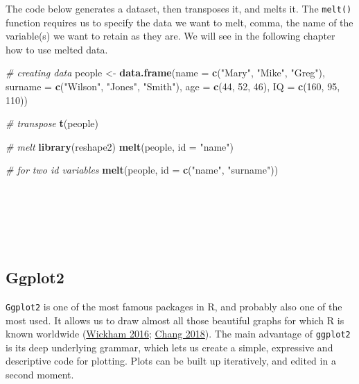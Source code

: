 \documentclass[
]{article}
\newenvironment{Shaded}{\begin{snugshade}}{\end{snugshade}}
\newcommand{\AttributeTok}[1]{\textcolor[rgb]{0.13,0.29,0.53}{#1}}
\newcommand{\CommentTok}[1]{\textcolor[rgb]{0.56,0.35,0.01}{\textit{#1}}}
\newcommand{\DecValTok}[1]{\textcolor[rgb]{0.00,0.00,0.81}{#1}}
\newcommand{\FunctionTok}[1]{\textcolor[rgb]{0.13,0.29,0.53}{\textbf{#1}}}
\newcommand{\NormalTok}[1]{#1}
\newcommand{\OtherTok}[1]{\textcolor[rgb]{0.56,0.35,0.01}{#1}}
\newcommand{\StringTok}[1]{\textcolor[rgb]{0.31,0.60,0.02}{#1}}
\begin{document}
The code below generates a dataset, then transposes it, and melts it.
The \texttt{melt()} function requires us to specify the data we want to melt,
comma, the name of the variable(s) we want to retain as they are. We
will see in the following chapter how to use melted data.

\begin{Shaded}
\begin{Highlighting}[]
\CommentTok{\# creating data}
\NormalTok{people }\OtherTok{\textless{}{-}} \FunctionTok{data.frame}\NormalTok{(}\AttributeTok{name =} \FunctionTok{c}\NormalTok{(}\StringTok{"Mary"}\NormalTok{, }\StringTok{"Mike"}\NormalTok{, }\StringTok{"Greg"}\NormalTok{),}
                     \AttributeTok{surname =} \FunctionTok{c}\NormalTok{(}\StringTok{"Wilson"}\NormalTok{, }\StringTok{"Jones"}\NormalTok{, }\StringTok{"Smith"}\NormalTok{),}
                     \AttributeTok{age =} \FunctionTok{c}\NormalTok{(}\DecValTok{44}\NormalTok{, }\DecValTok{52}\NormalTok{, }\DecValTok{46}\NormalTok{),}
                     \AttributeTok{IQ =} \FunctionTok{c}\NormalTok{(}\DecValTok{160}\NormalTok{, }\DecValTok{95}\NormalTok{, }\DecValTok{110}\NormalTok{))}

\CommentTok{\# transpose}
\FunctionTok{t}\NormalTok{(people)}

\CommentTok{\# melt}
\FunctionTok{library}\NormalTok{(reshape2)}
\FunctionTok{melt}\NormalTok{(people, }\AttributeTok{id =} \StringTok{"name"}\NormalTok{)}

\CommentTok{\# for two id variables}
\FunctionTok{melt}\NormalTok{(people, }\AttributeTok{id =} \FunctionTok{c}\NormalTok{(}\StringTok{"name"}\NormalTok{, }\StringTok{"surname"}\NormalTok{))}
\end{Highlighting}
\end{Shaded}

~

~

~

\hypertarget{ggplot2}{%
\subsection{Ggplot2}\label{ggplot2}}

\texttt{Ggplot2} is one of the most famous packages in R, and probably also one
of the most used. It allows us to draw almost all those beautiful graphs
for which R is known worldwide (\protect\hyperlink{ref-wickham2016}{Wickham 2016}; \protect\hyperlink{ref-chang2018}{Chang 2018}). The main
advantage of \texttt{ggplot2} is its deep underlying grammar, which lets us
create a simple, expressive and descriptive code for plotting. Plots can
be built up iteratively, and edited in a second moment.
\end{document}
